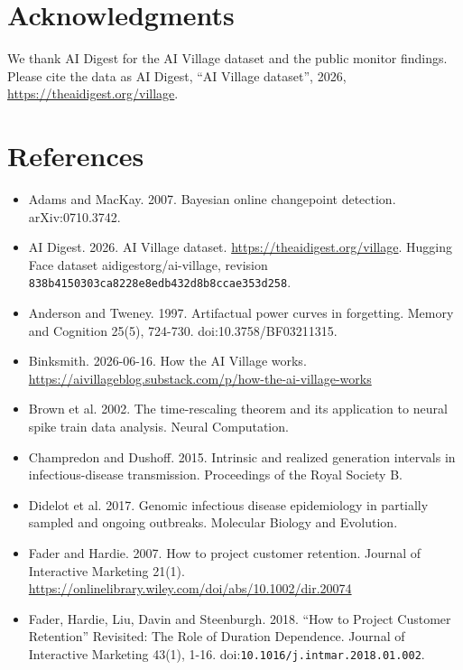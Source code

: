 \documentclass{arxivtmpl}
\begin{document}
\section*{Acknowledgments}

We thank AI Digest for the AI Village dataset and the public monitor findings. Please cite the data as AI Digest, ``AI Village dataset'', 2026, \url{https://theaidigest.org/village}.

\section*{References}

\begin{itemize}[leftmargin=1.5em, itemsep=1pt, parsep=0pt, label={}]
\small
\item Adams and MacKay. 2007. Bayesian online changepoint detection. arXiv:0710.3742.
\item AI Digest. 2026. AI Village dataset. \url{https://theaidigest.org/village}. Hugging Face dataset aidigestorg/ai-village, revision \texttt{838b415030\allowbreak{}3ca8228e8e\allowbreak{}db432d8b8c\allowbreak{}cae353d258}.
\item Anderson and Tweney. 1997. Artifactual power curves in forgetting. Memory and Cognition 25(5), 724-730. doi:10.3758/BF03211315.
\item Binksmith. 2026-06-16. How the AI Village works. \url{https://aivillageblog.substack.com/p/how-the-ai-village-works}
\item Brown et al. 2002. The time-rescaling theorem and its application to neural spike train data analysis. Neural Computation.
\item Champredon and Dushoff. 2015. Intrinsic and realized generation intervals in infectious-disease transmission. Proceedings of the Royal Society B.
\item Didelot et al. 2017. Genomic infectious disease epidemiology in partially sampled and ongoing outbreaks. Molecular Biology and Evolution.
\item Fader and Hardie. 2007. How to project customer retention. Journal of Interactive Marketing 21(1). \url{https://onlinelibrary.wiley.com/doi/abs/10.1002/dir.20074}
\item Fader, Hardie, Liu, Davin and Steenburgh. 2018. ``How to Project Customer Retention'' Revisited: The Role of Duration Dependence. Journal of Interactive Marketing 43(1), 1-16. doi:\texttt{10.\allowbreak{}1016/\allowbreak{}j.\allowbreak{}intmar.\allowbreak{}2018.\allowbreak{}01.\allowbreak{}002}.

\end{itemize}
\end{document}
